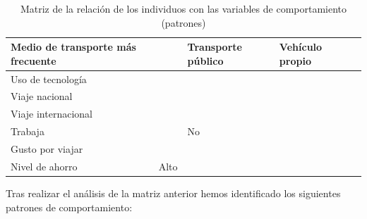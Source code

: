 \begin{table}[H]
\begin{tabular}{|p{10em}|p{7em}|p{7em}|p{7em}|p{8em}|}
        Medio de transporte más frecuente &                                             & Transporte público                            & Vehículo propio                                   \\ \hline
        Uso de tecnología                 &                                             & \cellcolor{green}{Alto}                       & \cellcolor{green}{Alto}                           \\ \hline
        Viaje nacional                    & \cellcolor{orange}{Si}                      & \cellcolor{orange}{Si}                        & \cellcolor{orange}{Si}                            \\ \hline
        Viaje internacional               & \cellcolor{orange}{Si}                      & \cellcolor{orange}{Si}                        & \cellcolor{orange}{Si}                            \\ \hline
        Trabaja                           & \cellcolor{yellow}{Si}                      & No                                            &                                                   \\ \hline
        Gusto por viajar                  &                                             & \cellcolor{green}{Si}                         & \cellcolor{green}{Si}                             \\ \hline
        Nivel de ahorro                   & Alto                                        & \cellcolor{purple}{Alto}                      & \cellcolor{purple}{Alto}                          \\ \hline
    \end{tabular}
    \caption{Matriz de la relación de los individuos con las variables de comportamiento (patrones)}
    \label{table:relacion-individuos-variables-patrones}
\end{table}
Tras realizar el análisis de la matriz anterior hemos identificado los siguientes patrones de comportamiento:
